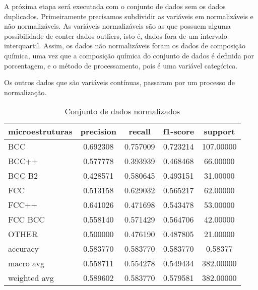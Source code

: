 A próxima etapa será executada com o conjunto de dados sem os dados duplicados. Primeiramente precisamos subdividir as variáveis em normalizáveis e não normalizáveis. As variáveis normalizáveis são as que possuem alguma possibilidade de conter dados outliers, isto é, dados fora de um intervalo interquartil. Assim, os dados não normalizáveis foram os dados de composição química, uma vez que a composição química do conjunto de dados é definida por porcentagem, e o método de processamento, pois é uma variável categórica.

Os outros dados que são variáveis contínuas, passaram por um processo de normalização. 


\begin{table}[htb]
\centering
\caption{Conjunto de dados normalizados}
\begin{supertabular}{l|c|c|c|c}
\hline
{ microestruturas } & { precision } & { recall } & { f1-score } & { support }\\\hline
{ BCC } &           {0.692308} & {0.757009} & {0.723214} & {107.00000}\\\hline
{ BCC++ } &         {0.577778} & {0.393939} & {0.468468} & {66.00000}\\\hline
{ BCC B2 } &        {0.428571} & {0.580645} & {0.493151} & {31.00000}\\\hline
{ FCC } &           {0.513158} & {0.629032} & {0.565217} & {62.00000}\\\hline
{ FCC++ } &         {0.641026} & {0.471698} & {0.543478} & {53.00000}\\\hline
{ FCC BCC } &       {0.558140} & {0.571429} & {0.564706} & {42.00000}\\\hline
{ OTHER } &         {0.500000} & {0.476190} & {0.487805} & {21.00000}\\\hline
{ accuracy } &      {0.583770} & {0.583770} & {0.583770} & {0.58377}\\\hline
{ macro avg } &     {0.558711} & {0.554278} & {0.549434} & {382.00000}\\\hline
{ weighted avg } &  {0.589602} & {0.583770} & {0.579581} & {382.00000}\\\hline
\end{supertabular}
    \legend{}
    \label{table:relatorio_normalizados}
\end{table}


